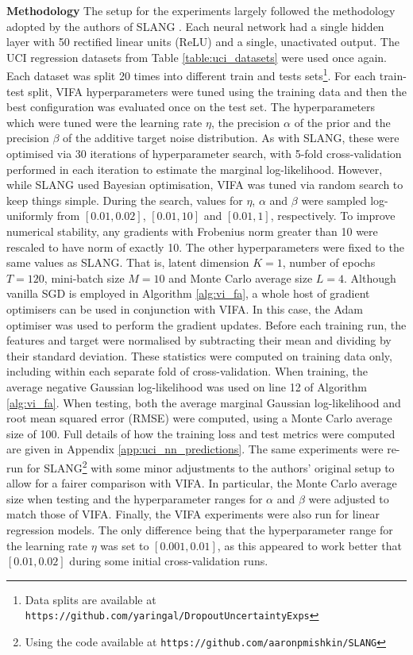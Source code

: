 \documentclass[10pt]{article} %
\begin{document}
\textbf{Methodology} The setup for the experiments largely followed the methodology adopted by the authors of SLANG \citep{mishkin2018}. Each neural network had a single hidden layer with 50 rectified linear units (ReLU) and a single, unactivated output. The UCI regression datasets from Table \ref{table:uci_datasets} were used once again. Each dataset was split 20 times into different train and tests sets\footnote{Data splits are available at \texttt{https://github.com/yaringal/DropoutUncertaintyExps}}. For each train-test split, VIFA hyperparameters were tuned using the training data and then the best configuration was evaluated once on the test set. The hyperparameters which were tuned were the learning rate $\eta$, the precision $\alpha$ of the prior and the precision $\beta$ of the additive target noise distribution. As with SLANG, these were optimised via 30 iterations of hyperparameter search, with 5-fold cross-validation performed in each iteration to estimate the marginal log-likelihood. However, while SLANG used Bayesian optimisation, VIFA was tuned via random search to keep things simple. During the search, values for $\eta$, $\alpha$ and $\beta$ were sampled log-uniformly from $[0.01, 0.02]$, $[0.01, 10]$ and $[0.01, 1]$, respectively. To improve numerical stability, any gradients with Frobenius norm greater than 10 were rescaled to have norm of exactly 10. The other hyperparameters were fixed to the same values as SLANG. That is, latent dimension $K=1$, number of epochs $T=120$, mini-batch size $M=10$ and Monte Carlo average size $L=4$. Although vanilla SGD is employed in Algorithm \ref{alg:vi_fa}, a whole host of gradient optimisers can be used in conjunction with VIFA. In this case, the Adam optimiser \citep{kingma2014} was used to perform the gradient updates. Before each training run, the features and target were normalised by subtracting their mean and dividing by their standard deviation. These statistics were computed on training data only, including within each separate fold of cross-validation. When training, the average negative Gaussian log-likelihood was used on line 12 of Algorithm \ref{alg:vi_fa}. When testing, both the average marginal Gaussian log-likelihood and root mean squared error (RMSE) were computed, using a Monte Carlo average size of 100. Full details of how the training loss and test metrics were computed are given in Appendix \ref{app:uci_nn_predictions}. The same experiments were re-run for SLANG\footnote{Using the code available at \texttt{https://github.com/aaronpmishkin/SLANG}} with some minor adjustments to the authors' original setup to allow for a fairer comparison with VIFA. In particular, the Monte Carlo average size when testing and the hyperparameter ranges for $\alpha$ and $\beta$ were adjusted to match those of VIFA. Finally, the VIFA experiments were also run for linear regression models. The only difference being that the hyperparameter range for the learning rate $\eta$ was set to $[0.001, 0.01]$, as this appeared to work better that $[0.01, 0.02]$ during some initial cross-validation runs. 
\end{document}
